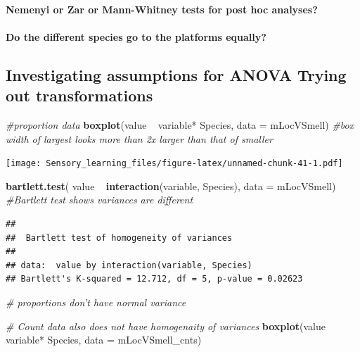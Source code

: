 \documentclass[]{article}
\newenvironment{Shaded}{\begin{snugshade}}{\end{snugshade}}
\newcommand{\KeywordTok}[1]{\textcolor[rgb]{0.13,0.29,0.53}{\textbf{{#1}}}}
\newcommand{\DataTypeTok}[1]{\textcolor[rgb]{0.13,0.29,0.53}{{#1}}}
\newcommand{\StringTok}[1]{\textcolor[rgb]{0.31,0.60,0.02}{{#1}}}
\newcommand{\CommentTok}[1]{\textcolor[rgb]{0.56,0.35,0.01}{\textit{{#1}}}}
\newcommand{\NormalTok}[1]{{#1}}
\let\oldparagraph\paragraph
\renewcommand{\paragraph}[1]{\oldparagraph{#1}\mbox{}}
\begin{document}
\paragraph{Nemenyi or Zar or Mann-Whitney tests for post hoc
analyses?}\label{nemenyi-or-zar-or-mann-whitney-tests-for-post-hoc-analyses-1}

\paragraph{Do the different species go to the platforms
equally?}\label{do-the-different-species-go-to-the-platforms-equally-1}

\subsection{Investigating assumptions for ANOVA Trying out
transformations}\label{investigating-assumptions-for-anova-trying-out-transformations-1}

\begin{Shaded}
\begin{Highlighting}[]
\CommentTok{#proportion data}
\KeywordTok{boxplot}\NormalTok{(value ~}\StringTok{  }\NormalTok{variable*}\StringTok{ }\NormalTok{Species, }\DataTypeTok{data =} \NormalTok{mLocVSmell) }\CommentTok{#box width of largest looks more than 2x larger than that of smaller}
\end{Highlighting}
\end{Shaded}

\texttt{[image: Sensory\_learning\_files/figure-latex/unnamed-chunk-41-1.pdf]}

\begin{Shaded}
\begin{Highlighting}[]
\KeywordTok{bartlett.test}\NormalTok{( value ~}\StringTok{  }\KeywordTok{interaction}\NormalTok{(variable, Species), }\DataTypeTok{data =} \NormalTok{mLocVSmell) }\CommentTok{#Bartlett test shows variances are different}
\end{Highlighting}
\end{Shaded}

\begin{verbatim}
## 
##  Bartlett test of homogeneity of variances
## 
## data:  value by interaction(variable, Species)
## Bartlett's K-squared = 12.712, df = 5, p-value = 0.02623
\end{verbatim}

\begin{Shaded}
\begin{Highlighting}[]
\CommentTok{# proportions don't have normal variance}

\CommentTok{# Count data also does not have homogenaity of variances}
 \KeywordTok{boxplot}\NormalTok{(value ~}\StringTok{  }\NormalTok{variable*}\StringTok{ }\NormalTok{Species, }\DataTypeTok{data =} \NormalTok{mLocVSmell_cnts)}
\end{Highlighting}
\end{Shaded}
\end{document}
